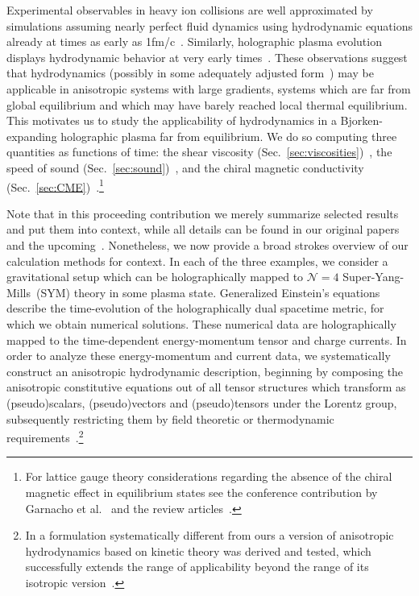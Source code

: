 \documentclass[preprint,12pt]{elsarticle}
\begin{document}
%
Experimental observables in heavy ion collisions are well approximated by simulations assuming nearly perfect fluid dynamics using hydrodynamic equations already at times as early as 1fm/c~\cite{Romatschke:2017ejr,noronha-hostlerUnreasonableEffectivenessHydrodynamics2016}. 
%
Similarly, holographic plasma evolution displays hydrodynamic behavior at very early times~\cite{Chesler:2008hg,Chesler:2009cy,Chesler:2010bi}. 
%
These observations suggest that hydrodynamics (possibly in some adequately adjusted form~\cite{Romatschke:2017vte}) may be applicable in anisotropic systems with large gradients, systems which are far from global equilibrium and which may have barely reached local thermal equilibrium. 
% 
This motivates us to study the applicability of hydrodynamics in a Bjorken-expanding holographic plasma far from equilibrium. We do so computing three quantities as functions of time: 
the shear viscosity (Sec.~\ref{sec:viscosities})~\cite{wondrak2020shear}, the speed of sound (Sec.~\ref{sec:sound})~\cite{Cartwright:2022hlg, Cartwright:2026}, and the chiral magnetic conductivity (Sec.~\ref{sec:CME})~\cite{Cartwright:2021maz}.\footnote{For lattice gauge theory considerations regarding the absence of the chiral magnetic effect in equilibrium states see the conference contribution by Garnacho et al.~\cite{GarnachoXQCD2025} and the review articles~\cite{Endrodi:2024cqn,Adhikari:2024bfa}.} 

%
Note that in this proceeding contribution we merely summarize selected results and put them into context, while all details can be found in our original papers~\cite{Cartwright:2022hlg,wondrak2020shear, Cartwright:2021maz,Ammon:2020rvg} and the upcoming~\cite{Cartwright:2026}. 
Nonetheless, we now provide a broad strokes overview of our calculation methods for context. In each of the three examples, we consider a gravitational setup which can be holographically mapped to $\mathcal{N}=4$ Super-Yang-Mills~(SYM) theory in some plasma state. Generalized Einstein's equations describe the time-evolution of the holographically dual spacetime metric, for which we obtain numerical solutions. These numerical data are holographically mapped to the time-dependent energy-momentum tensor and charge currents. In order to analyze these energy-momentum and current data, we systematically construct an anisotropic hydrodynamic description, beginning by composing the anisotropic constitutive equations out of all tensor structures which transform as (pseudo)scalars, (pseudo)vectors and (pseudo)tensors under the Lorentz group, subsequently restricting them by field theoretic or thermodynamic requirements~\cite{Jensen:2012jh,Jensen:2011xb,Banerjee:2012iz,Haehl:2014zda,Crossley:2015evo}.\footnote{In a formulation systematically different from ours a version of anisotropic hydrodynamics based on kinetic theory was derived and tested, which successfully extends the range of applicability beyond the range of its isotropic  version~\cite{Martinez:2010sd,Florkowski:2010cf,Ryblewski:2010bs,Ryblewski:2010tn,Ryblewski:2011aq,Ryblewski:2012rr,Florkowski:2012lba,Bazow:2013ifa,Strickland:2014pga,Alqahtani:2017mhy,Strickland:2017kux}.}
\end{document}
